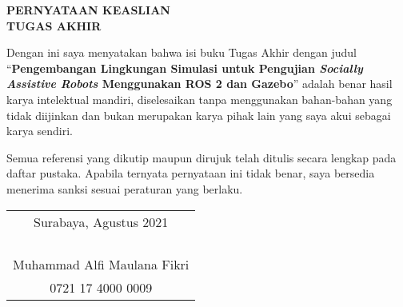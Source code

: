 \begin{center}
  \large
  \textbf{PERNYATAAN KEASLIAN\\TUGAS AKHIR}
\end{center}

\thispagestyle{empty}
\vspace{2ex}

Dengan ini saya menyatakan bahwa isi buku Tugas Akhir dengan judul
``\textbf{Pengembangan Lingkungan Simulasi untuk Pengujian \emph{Socially Assistive Robots} Menggunakan ROS 2 dan Gazebo}''
adalah benar hasil karya intelektual mandiri, diselesaikan tanpa menggunakan bahan-bahan yang tidak diijinkan dan bukan merupakan karya pihak lain yang saya akui sebagai karya sendiri.

Semua referensi yang dikutip maupun dirujuk telah ditulis secara lengkap pada daftar pustaka.
Apabila ternyata pernyataan ini tidak benar, saya bersedia menerima sanksi sesuai peraturan yang berlaku.

\vspace{4ex}

\begin{flushright}
  \begin{tabular}[b]{c}
    Surabaya, Agustus 2021\\
    \\
    \\
    \\
    \\
    Muhammad Alfi Maulana Fikri\\
    0721 17 4000 0009
  \end{tabular}
\end{flushright}
